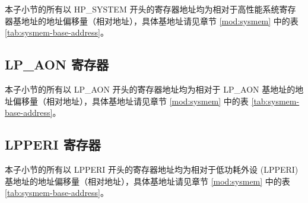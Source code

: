 \documentclass[main\_\_CN.tex]{subfiles}
\begin{document}
本子小节的所有以 HP\_SYSTEM 开头的寄存器地址均为相对于高性能系统寄存器基地址的地址偏移量（相对地址），具体基地址请见章节 \ref{mod:sysmem} \textit{} 中的表 \ref{tab:sysmem-base-address}。


\newpage
\subsection{LP\_AON 寄存器}
\label{sec:sysreg-reg-lpaon}

本子小节的所有以 LP\_AON 开头的寄存器地址均为相对于 LP\_AON 基地址的地址偏移量（相对地址），具体基地址请见章节 \ref{mod:sysmem} \textit{} 中的表 \ref{tab:sysmem-base-address}。


\newpage
\subsection{LPPERI 寄存器}
\label{sec:sysreg-reg-lpperi}

本子小节的所有以 LPPERI 开头的寄存器地址均为相对于低功耗外设 (LPPERI) 基地址的地址偏移量（相对地址），具体基地址请见章节 \ref{mod:sysmem} \textit{} 中的表 \ref{tab:sysmem-base-address}。


\end{document}
